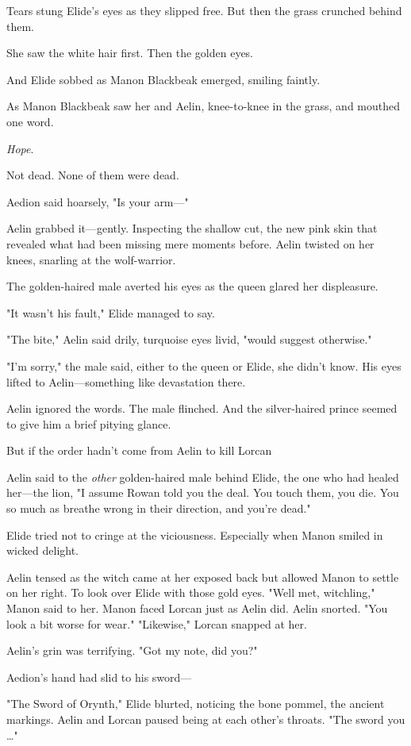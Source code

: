 Tears stung Elide's eyes as they slipped free. But then the grass crunched behind them.

She saw the white hair first. Then the golden eyes.

And Elide sobbed as Manon Blackbeak emerged, smiling faintly.

As Manon Blackbeak saw her and Aelin, knee-to-knee in the grass, and mouthed one word.

\emph{Hope}.

Not dead. None of them were dead.

Aedion said hoarsely, "Is your arm---"

Aelin grabbed it---gently. Inspecting the shallow cut, the new pink skin that revealed what had been missing mere moments before. Aelin twisted on her knees, snarling at the wolf-warrior.

The golden-haired male averted his eyes as the queen glared her displeasure.

"It wasn't his fault," Elide managed to say.

"The bite," Aelin said drily, turquoise eyes livid, "would suggest otherwise."

"I'm sorry," the male said, either to the queen or Elide, she didn't know. His eyes lifted to Aelin---something like devastation there.

Aelin ignored the words. The male flinched. And the silver-haired prince seemed to give him a brief pitying glance.

But if the order hadn't come from Aelin to kill Lorcan 

Aelin said to the \emph{other} golden-haired male behind Elide, the one who had healed her---the lion, "I assume Rowan told you the deal. You touch them, you die. You so much as breathe wrong in their direction, and you're dead."

Elide tried not to cringe at the viciousness. Especially when Manon smiled in wicked delight.

Aelin tensed as the witch came at her exposed back but allowed Manon to settle on her right. To look over Elide with those gold eyes. "Well met, witchling," Manon said to her. Manon faced Lorcan just as Aelin did. Aelin snorted. "You look a bit worse for wear." "Likewise," Lorcan snapped at her.

Aelin's grin was terrifying. "Got my note, did you?"

Aedion's hand had slid to his sword---

"The Sword of Orynth," Elide blurted, noticing the bone pommel, the ancient markings. Aelin and Lorcan paused being at each other's throats. "The sword  you \ldots"

